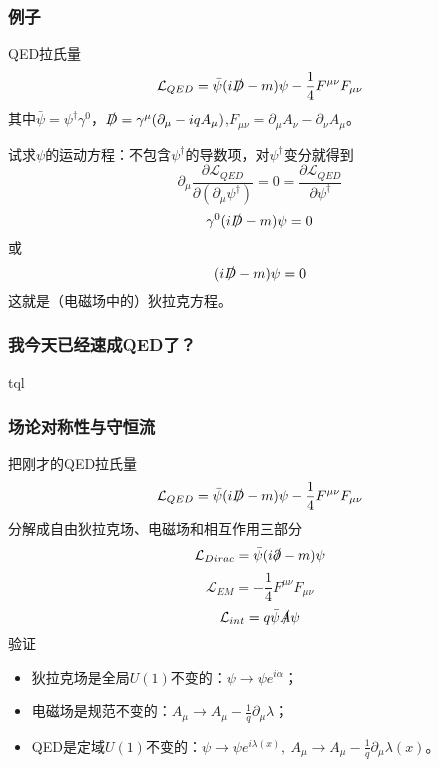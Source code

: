 \documentclass[CJK]{beamer}
\begin{document}
\begin{frame}
\frametitle{\bch 例子 \ech}
\bch
QED拉氏量
$$
\mathcal{L}_{QED} = \bar{\psi} ( i \slashed{D} - m) \psi - \frac{1}{4} F^{\mu \nu} F_{\mu \nu}$$
其中$\bar{\psi} = \psi^\dagger \gamma^0$，$\slashed D = \gamma^\mu ( \partial_\mu - iq A_\mu)$,$F_{\mu \nu} = \partial_\mu A_\nu - \partial_\nu A_\mu$。
\par
试求$\psi$的运动方程：不包含$\psi^\dagger$的导数项，对$\psi^\dagger$变分就得到
$$
\partial_\mu \frac{\partial \mathcal{L}_{QED} }{\partial (\partial_\mu \psi^\dagger)} = 0 = \frac{\partial \mathcal{L}_{QED}}{\partial \psi^\dagger}$$
$$
\gamma^0 (i \slashed{D} - m) \psi = 0
$$
或
$$
(i\slashed{D} - m) \psi =0
$$
这就是（电磁场中的）狄拉克方程。

\ech
\end{frame}

\begin{frame}
\frametitle{\bch 我今天已经速成QED了？ \ech}
\bch
{\Huge \centering tql}
\ech
\end{frame}

\begin{frame}
\frametitle{\bch 场论对称性与守恒流 \ech}
\bch
把刚才的QED拉氏量
$$
\mathcal{L}_{QED} = \bar{\psi} ( i \slashed{D} - m) \psi - \frac{1}{4} F^{\mu \nu} F_{\mu \nu}$$
分解成自由狄拉克场、电磁场和相互作用三部分
$$
\mathcal{L}_{Dirac} = \bar{\psi} ( i \slashed{\partial} - m) \psi 
$$
$$
\mathcal{L}_{EM} = - \frac{1}{4} F^{\mu \nu} F_{\mu \nu}
$$
$$
\mathcal{L}_{int} = q \bar{\psi} \slashed{A} \psi
$$
验证
\begin{itemize}
\item 狄拉克场是全局$U(1)$不变的：$\psi \to \psi e^{i \alpha}$；
\item 电磁场是规范不变的：$A_\mu \to A_\mu - \frac{1}{q} \partial_\mu \lambda$；
\item QED是定域$U(1)$不变的：$\psi \to \psi e^{i \lambda(x)},\ A_\mu \to A_\mu - \frac{1}{q} \partial_\mu \lambda(x)$。
\end{itemize}
\ech
\end{frame}
\end{document}
